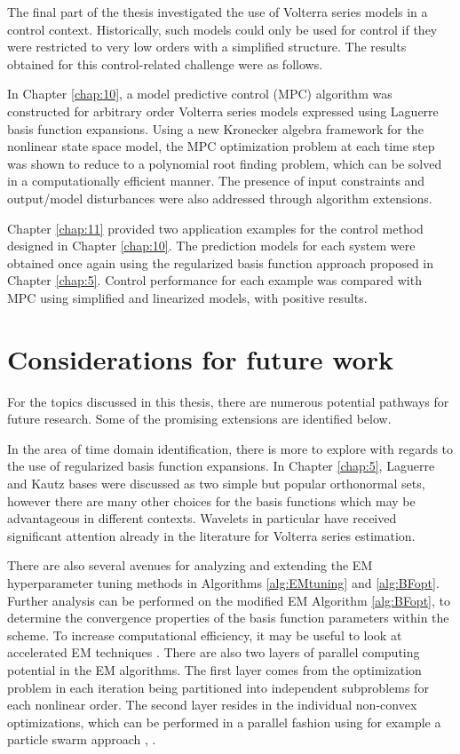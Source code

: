 The final part of the thesis investigated the use of Volterra series models in a control context. Historically, such models could only be used for control if they were restricted to very low orders with a simplified structure. The results obtained for this control-related challenge were as follows.

In Chapter \ref{chap:10}, a model predictive control (MPC) algorithm was constructed for arbitrary order Volterra series models expressed using Laguerre basis function expansions. Using a new Kronecker algebra framework for the nonlinear state space model, the MPC optimization problem at each time step was shown to reduce to a polynomial root finding problem, which can be solved in a computationally efficient manner. The presence of input constraints and output/model disturbances were also addressed through algorithm extensions.

Chapter \ref{chap:11} provided two application examples for the control method designed in Chapter \ref{chap:10}. The prediction models for each system were obtained once again using the regularized basis function approach proposed in Chapter \ref{chap:5}. Control performance for each example was compared with MPC using simplified and linearized models, with positive results.

\section{Considerations for future work}

For the topics discussed in this thesis, there are numerous potential pathways for future research. Some of the promising extensions are identified below.  

In the area of time domain identification, there is more to explore with regards to the use of regularized basis function expansions. In Chapter \ref{chap:5}, Laguerre and Kautz bases were discussed as two simple but popular orthonormal sets, however there are many other choices for the basis functions which may be advantageous in different contexts. Wavelets in particular have received significant attention already in the literature for Volterra series estimation.

There are also several avenues for analyzing and extending the EM hyperparameter tuning methods in Algorithms \ref{alg:EMtuning} and \ref{alg:BFopt}. Further analysis can be performed on the modified EM Algorithm \ref{alg:BFopt}, to determine the convergence properties of the basis function parameters within the scheme. To increase computational efficiency, it may be useful to look at accelerated EM techniques \cite{McLachlan2007}. There are also two layers of parallel computing potential in the EM algorithms. The first layer comes from the optimization problem in each iteration being partitioned into independent subproblems for each nonlinear order. The second layer resides in the individual non-convex optimizations, which can be performed in a parallel fashion using for example a particle swarm approach \cite{Kennedy1995}, \cite{Eberhart1995}. 

